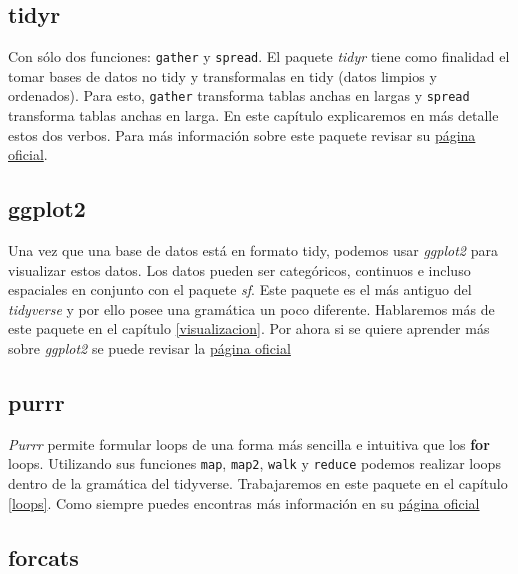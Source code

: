 \documentclass[]{book}
\begin{document}
\hypertarget{tidyr}{%
\subsection{tidyr}\label{tidyr}}

Con sólo dos funciones: \texttt{gather} y \texttt{spread}. El paquete
\emph{tidyr} \citep{Wickhamtidy} tiene como finalidad el tomar bases de
datos no tidy y transformalas en tidy (datos limpios y ordenados). Para
esto, \texttt{gather} transforma tablas anchas en largas y
\texttt{spread} transforma tablas anchas en larga. En este capítulo
explicaremos en más detalle estos dos verbos. Para más información sobre
este paquete revisar su \href{https://tidyr.tidyverse.org/}{página
oficial}.

\hypertarget{ggplot2}{%
\subsection{ggplot2}\label{ggplot2}}

Una vez que una base de datos está en formato tidy, podemos usar
\emph{ggplot2} \citep{Wickhamggplot} para visualizar estos datos. Los
datos pueden ser categóricos, continuos e incluso espaciales en conjunto
con el paquete \emph{sf}. Este paquete es el más antiguo del
\emph{tidyverse} y por ello posee una gramática un poco diferente.
Hablaremos más de este paquete en el capítulo \ref{visualizacion}. Por
ahora si se quiere aprender más sobre \emph{ggplot2} se puede revisar la
\href{https://ggplot2.tidyverse.org/}{página oficial}

\hypertarget{purrr}{%
\subsection{purrr}\label{purrr}}

\emph{Purrr} \citep{HenryPurrr} permite formular loops de una forma más
sencilla e intuitiva que los \textbf{for} loops. Utilizando sus
funciones \texttt{map}, \texttt{map2}, \texttt{walk} y \texttt{reduce}
podemos realizar loops dentro de la gramática del tidyverse.
Trabajaremos en este paquete en el capítulo \ref{loops}. Como siempre
puedes encontras más información en su
\href{https://purrr.tidyverse.org/}{página oficial}

\hypertarget{forcats}{%
\subsection{forcats}\label{forcats}}
\end{document}
